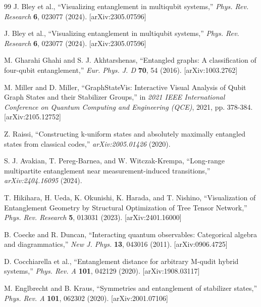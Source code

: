 \documentclass[12pt,a4paper]{article}
\begin{document}
\begin{thebibliography}{99}
	 J. Bley et al., ``Visualizing entanglement in multiqubit systems,'' \textit{Phys. Rev. Research} \textbf{6}, 023077 (2024). [arXiv:2305.07596]

	 J. Bley et al., ``Visualizing entanglement in multiqubit systems,'' \textit{Phys. Rev. Research} \textbf{6}, 023077 (2024). [arXiv:2305.07596]

	 M. Gharahi Ghahi and S. J. Akhtarshenas, ``Entangled graphs: A classification of four-qubit entanglement,'' \textit{Eur. Phys. J. D} \textbf{70}, 54 (2016). [arXiv:1003.2762]

	 M. Miller and D. Miller, ``GraphStateVis: Interactive Visual Analysis of Qubit Graph States and their Stabilizer Groups,'' in \textit{2021 IEEE International Conference on Quantum Computing and Engineering (QCE)}, 2021, pp. 378-384. [arXiv:2105.12752]

	 Z. Raissi, ``Constructing k-uniform states and absolutely maximally entangled states from classical codes,'' \textit{arXiv:2005.01426} (2020).

	 S. J. Avakian, T. Pereg-Barnea, and W. Witczak-Krempa, ``Long-range multipartite entanglement near measurement-induced transitions,'' \textit{arXiv:2404.16095} (2024).

	 T. Hikihara, H. Ueda, K. Okunishi, K. Harada, and T. Nishino, ``Visualization of Entanglement Geometry by Structural Optimization of Tree Tensor Network,'' \textit{Phys. Rev. Research} \textbf{5}, 013031 (2023). [arXiv:2401.16000]

	 B. Coecke and R. Duncan, ``Interacting quantum observables: Categorical algebra and diagrammatics,'' \textit{New J. Phys.} \textbf{13}, 043016 (2011). [arXiv:0906.4725]

	 D. Cocchiarella et al., ``Entanglement distance for arbitrary M-qudit hybrid systems,'' \textit{Phys. Rev. A} \textbf{101}, 042129 (2020). [arXiv:1908.03117]

	 M. Englbrecht and B. Kraus, ``Symmetries and entanglement of stabilizer states,'' \textit{Phys. Rev. A} \textbf{101}, 062302 (2020). [arXiv:2001.07106]





\end{thebibliography}
\end{document}
